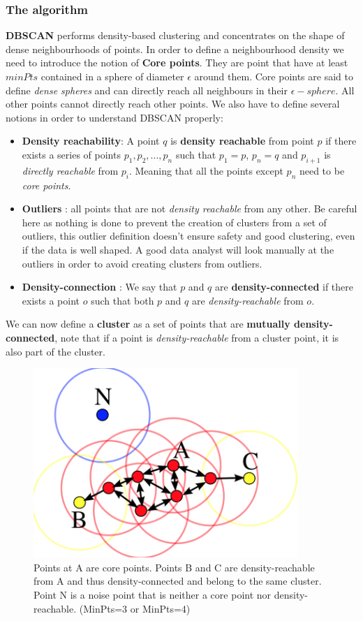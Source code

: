 \subsubsection{The algorithm}
\textbf{DBSCAN} performs density-based clustering and concentrates on the shape of dense neighbourhoods of points. In order to define a neighbourhood density we need to introduce the notion of \textbf{Core points}. They are point that have at least $minPts$ contained in a sphere of diameter $\epsilon$ around them. Core points are said to define \emph{dense spheres} and can directly reach all neighbours in their $\epsilon - sphere$. All other points cannot directly reach other points. We also have to define several notions in order to understand DBSCAN properly: 
\begin{itemize}
\item \textbf{Density reachability}: A point $q$ is \textbf{density reachable} from point $p$ if there exists a series of points $p_{1}, p_{2},..., p_{n}$ such that $p_{1}=p$, $p_{n}=q$ and $p_{i+1}$ is \emph{directly reachable} from $p_{i}$. Meaning that all the points except $p_{n}$ need to be \emph{core points}. 
\item \textbf{Outliers} : all points that are not \emph{density reachable} from any other. Be careful here as nothing is done to prevent the creation of clusters from a set of outliers, this outlier definition doesn't ensure safety and good clustering, even if the data is well shaped. A good data analyst will look manually at the outliers in order to avoid creating clusters from outliers.
\item \textbf{Density-connection} : We say that $p$ and $q$ are \textbf{density-connected} if there exists a point $o$ such that both $p$ and $q$ are \emph{density-reachable} from $o$.
\end{itemize}
We can now define a \textbf{cluster} as a set of points that are \textbf{mutually density-connected}, note that if a point is \emph{density-reachable} from a cluster point, it is also part of the cluster.

\begin{figure}[!h]%
 \centering
 \includegraphics[width=10cm]{./img/09/dbscan}
 \caption{\label{pic:dbscan} Points at A are core points. Points B and C are density-reachable from A and thus density-connected and belong to the same cluster. Point N is a noise point that is neither a core point nor density-reachable. (MinPts=3 or MinPts=4) }
\end{figure}

